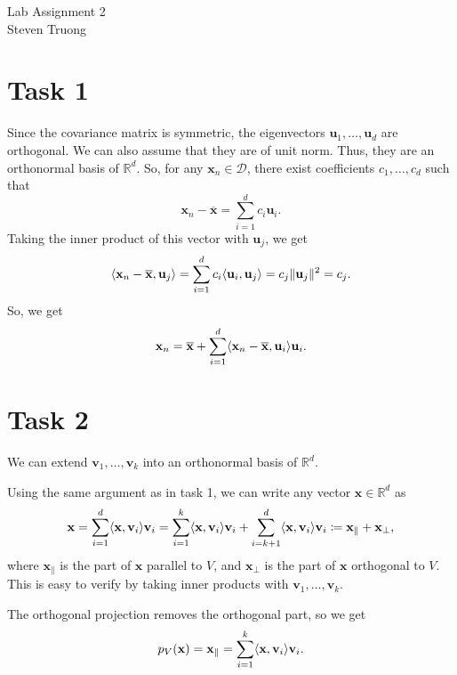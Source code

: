 \documentclass{article}
\newcommand{\R}{\mathbb{R}}
\newcommand{\mean}[1]{\overline{#1}}
\renewcommand{\vec}[1]{\mathbf{#1}}
\DeclarePairedDelimiter{\p}{(}{)}
\DeclarePairedDelimiter{\norm}{\Vert}{\Vert}
\DeclarePairedDelimiter{\inner}{\langle}{\rangle}
\begin{document}
{\huge Lab Assignment 2} \\	
\large Steven Truong

\section*{Task 1}
Since the covariance matrix is symmetric, the eigenvectors $\vec{u}_1, \ldots, \vec{u}_d$ are orthogonal. We can also assume that they are of unit norm. Thus, they are an orthonormal basis of $\R^d$. So, for any $\vec{x}_n \in \mathcal{D}$, there exist coefficients $c_1, \ldots, c_d$ such that
\[
	\vec{x}_n - \mean{\vec{x}} = \sum_{i=1}^d c_i\vec{u}_i.
\]
Taking the inner product of this vector with $\vec{u}_j$, we get
\[
	\inner{\vec{x}_n - \mean{\vec{x}}, \vec{u}_j} = \sum_{i=1}^d c_i\inner{\vec{u}_i, \vec{u}_j} = c_j\norm{\vec{u}_j}^2 = c_j.
\]
So, we get
\[
	\vec{x}_n = \mean{\vec{x}} + \sum_{i=1}^d \inner{\vec{x}_n - \mean{\vec{x}}, \vec{u}_i}\vec{u}_i.
\]

\section*{Task 2}
We can extend $\vec{v}_1, \ldots, \vec{v}_k$ into an orthonormal basis of $\R^d$.

Using the same argument as in task 1, we can write any vector $\vec{x} \in \R^d$ as
\[
	\vec{x} = \sum_{i=1}^d \inner{\vec{x}, \vec{v}_i}\vec{v}_i = \sum_{i=1}^k \inner{\vec{x}, \vec{v}_i}\vec{v}_i + \sum_{i=k+1}^d \inner{\vec{x}, \vec{v}_i}\vec{v}_i \coloneqq \vec{x}_\parallel + \vec{x}_\bot,
\]
where $\vec{x}_\parallel$ is the part of $\vec{x}$ parallel to $V$, and $\vec{x}_\bot$ is the part of $\vec{x}$ orthogonal to $V$. This is easy to verify by taking inner products with $\vec{v}_1, \ldots, \vec{v}_k$.

The orthogonal projection removes the orthogonal part, so we get
\[
	p_V\p{\vec{x}} = \vec{x}_\parallel = \sum_{i=1}^k \inner{\vec{x}, \vec{v}_i}\vec{v}_i.
\]
\end{document}
